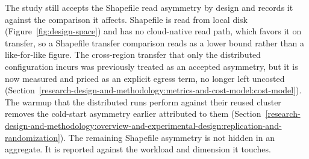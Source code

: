 The study still accepts the Shapefile read asymmetry by design and records it against the comparison it affects. Shapefile is read from local disk (Figure~\ref{fig:design-space}) and has no cloud-native read path, which favors it on transfer, so a Shapefile transfer comparison reads as a lower bound rather than a like-for-like figure. The cross-region transfer that only the distributed configuration incurs was previously treated as an accepted asymmetry, but it is now measured and priced as an explicit egress term, no longer left uncosted (Section~\ref{research-design-and-methodology:metrics-and-cost-model:cost-model}). The warmup that the distributed runs perform against their reused cluster removes the cold-start asymmetry earlier attributed to them (Section~\ref{research-design-and-methodology:overview-and-experimental-design:replication-and-randomization}). The remaining Shapefile asymmetry is not hidden in an aggregate. It is reported against the workload and dimension it touches.